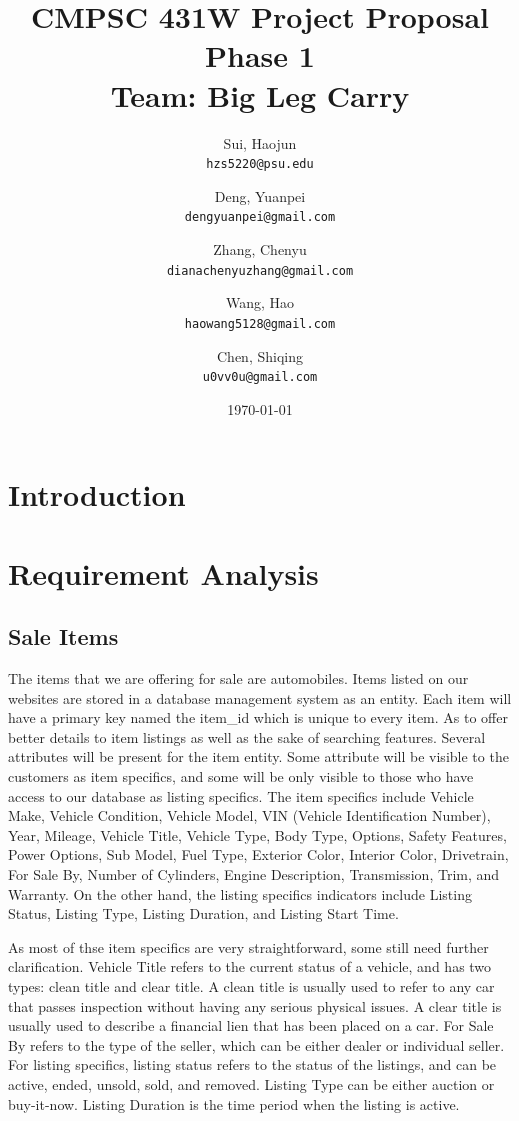 \documentclass[12pt]{article}
\title{CMPSC 431W Project Proposal\\Phase 1\\Team: Big Leg Carry}
\author{
	Sui, Haojun\\
	\texttt{hzs5220@psu.edu}
	\and
	Deng, Yuanpei\\
	\texttt{dengyuanpei@gmail.com}
	\and
	Zhang, Chenyu\\
	\texttt{dianachenyuzhang@gmail.com}
	\and
	Wang, Hao\\
	\texttt{haowang5128@gmail.com}
	\and
	Chen, Shiqing\\
	\texttt{u0vv0u@gmail.com}
}
\date{\today}
\begin{document}
\maketitle
\thispagestyle{empty}
\newpage
\tableofcontents
\setcounter{page}{1}
\newpage
\listoffigures
\newpage
\listoftables
\newpage


\section{Introduction}
\newpage

\section{Requirement Analysis}
\subsection{Sale Items}
The items that we are offering for sale are automobiles. Items listed on our websites are stored in a database management system as an entity. Each item will have a primary key named the item\_id which is unique to every item. As to offer better details to item listings as well as the sake of searching features. Several attributes will be present for the item entity. Some attribute will be visible to the customers as item specifics, and some will be only visible to those who have access to our database as listing specifics. The item specifics include Vehicle Make, Vehicle Condition, Vehicle Model, VIN (Vehicle Identification Number), Year, Mileage, Vehicle Title, Vehicle Type, Body Type, Options, Safety Features, Power Options, Sub Model, Fuel Type, Exterior Color, Interior Color, Drivetrain, For Sale By, Number of Cylinders, Engine Description, Transmission, Trim, and Warranty. On the other hand, the listing specifics indicators include Listing Status, Listing Type, Listing Duration, and Listing Start Time.\par
As most of thse item specifics are very straightforward, some still need further clarification. Vehicle Title refers to the current status of a vehicle, and has two types: clean title and clear title. A clean title is usually used to refer to any car that passes inspection without having any serious physical issues. A clear title is usually used to describe a financial lien that has been placed on a car. For Sale By refers to the type of the seller, which can be either dealer or individual seller. For listing specifics, listing status refers to the status of the listings, and can be active, ended, unsold, sold, and removed. Listing Type can be either auction or buy-it-now. Listing Duration is the time period when the listing is active.
\end{document}
